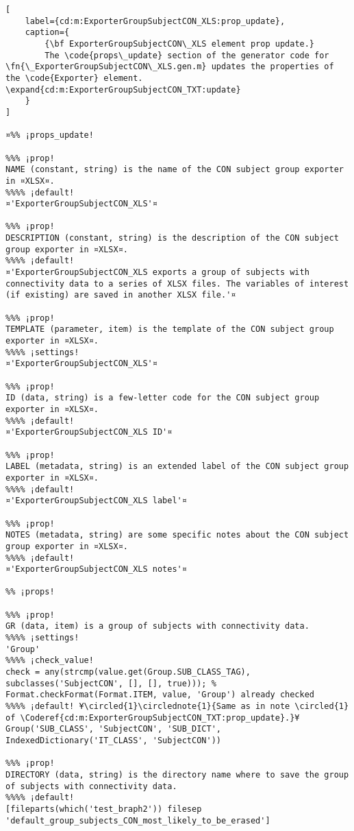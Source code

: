 \documentclass{tufte-handout}
\begin{document}
\begin{lstlisting}[
	label={cd:m:ExporterGroupSubjectCON_XLS:prop_update},
	caption={
		{\bf ExporterGroupSubjectCON\_XLS element prop update.}
		The \code{props\_update} section of the generator code for \fn{\_ExporterGroupSubjectCON\_XLS.gen.m} updates the properties of the \code{Exporter} element. \expand{cd:m:ExporterGroupSubjectCON_TXT:update}
	}
]

¤%% ¡props_update!

%%% ¡prop!
NAME (constant, string) is the name of the CON subject group exporter in ¤XLSX¤.
%%%% ¡default!
¤'ExporterGroupSubjectCON_XLS'¤

%%% ¡prop!
DESCRIPTION (constant, string) is the description of the CON subject group exporter in ¤XLSX¤.
%%%% ¡default!
¤'ExporterGroupSubjectCON_XLS exports a group of subjects with connectivity data to a series of XLSX files. The variables of interest (if existing) are saved in another XLSX file.'¤

%%% ¡prop!
TEMPLATE (parameter, item) is the template of the CON subject group exporter in ¤XLSX¤.
%%%% ¡settings!
¤'ExporterGroupSubjectCON_XLS'¤

%%% ¡prop!
ID (data, string) is a few-letter code for the CON subject group exporter in ¤XLSX¤.
%%%% ¡default!
¤'ExporterGroupSubjectCON_XLS ID'¤

%%% ¡prop!
LABEL (metadata, string) is an extended label of the CON subject group exporter in ¤XLSX¤.
%%%% ¡default!
¤'ExporterGroupSubjectCON_XLS label'¤

%%% ¡prop!
NOTES (metadata, string) are some specific notes about the CON subject group exporter in ¤XLSX¤.
%%%% ¡default!
¤'ExporterGroupSubjectCON_XLS notes'¤

%% ¡props!

%%% ¡prop!
GR (data, item) is a group of subjects with connectivity data.
%%%% ¡settings!
'Group'
%%%% ¡check_value!
check = any(strcmp(value.get(Group.SUB_CLASS_TAG), subclasses('SubjectCON', [], [], true))); % Format.checkFormat(Format.ITEM, value, 'Group') already checked
%%%% ¡default! ¥\circled{1}\circlednote{1}{Same as in note \circled{1} of \Coderef{cd:m:ExporterGroupSubjectCON_TXT:prop_update}.}¥
Group('SUB_CLASS', 'SubjectCON', 'SUB_DICT', IndexedDictionary('IT_CLASS', 'SubjectCON'))

%%% ¡prop!
DIRECTORY (data, string) is the directory name where to save the group of subjects with connectivity data.
%%%% ¡default!
[fileparts(which('test_braph2')) filesep 'default_group_subjects_CON_most_likely_to_be_erased']


\end{lstlisting}
\end{document}
